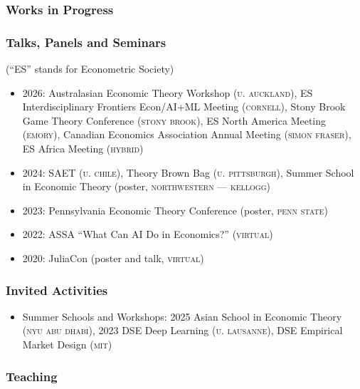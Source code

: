\documentclass[12pt]{article}   %
\begin{document}
\subsubsection*{Works in Progress}
\hspace*{1.2cm}%
\begin{minipage}{0.9\textwidth}%
  \printbibliography[heading=none, sorting=ynt, keyword=workinprogress]
\end{minipage}%

\subsubsection*{Talks, Panels and Seminars}

(``ES'' stands for Econometric Society)

\begin{itemize}
  \item 2026: Australasian Economic Theory Workshop (\textsc{u. auckland}), ES Interdisciplinary Frontiers Econ/AI+ML Meeting (\textsc{cornell}), Stony Brook Game Theory Conference (\textsc{stony brook}), ES North America Meeting (\textsc{emory}), Canadian Economics Association Annual Meeting (\textsc{simon fraser}), ES Africa Meeting (\textsc{hybrid})%
  \item 2024: SAET (\textsc{u. chile}), Theory Brown Bag (\textsc{u. pittsburgh}), Summer School in Economic Theory (poster, \textsc{northwestern --- kellogg})
  \item 2023: Pennsylvania Economic Theory Conference (poster, \textsc{penn state})
  \item 2022: ASSA ``What Can AI Do in Economics?'' (\textsc{virtual})
  \item 2020: JuliaCon (poster and talk, \textsc{virtual})
\end{itemize}

\subsubsection*{Invited Activities}
\begin{itemize}
  \item Summer Schools and Workshops: 2025 Asian School in Economic Theory (\textsc{nyu abu dhabi}), 2023 DSE Deep Learning (\textsc{u. lausanne}), DSE Empirical Market Design (\textsc{mit})
\end{itemize}

\subsubsection*{Teaching}
\end{document}
